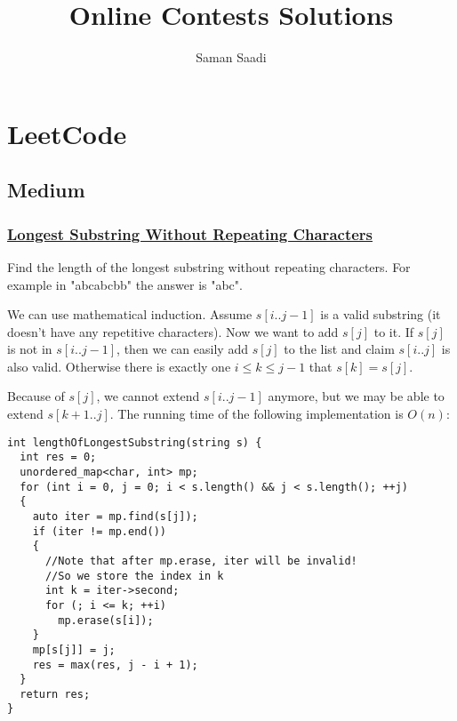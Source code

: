 \documentclass{book}
\title{Online Contests Solutions}
\author{Saman Saadi}
\date{}
\begin{document}
	\frontmatter
	\maketitle
	\tableofcontents
	\mainmatter
	\chapter{LeetCode}
	\section{Medium}
	\subsection{\href{https://leetcode.com/problems/longest-substring-without-repeating-characters}{Longest Substring Without Repeating Characters}}
	Find the length of the longest substring without repeating characters. For example in "abcabcbb" the answer is "abc".
	\par We can use mathematical induction. Assume $s[i..j - 1]$ is a valid substring (it doesn't have any repetitive characters). Now we want to add $s[j]$ to it. If $s[j]$ is not in $s[i..j-1]$, then we can easily add $s[j]$ to the list and claim $s[i..j]$ is also valid. Otherwise there is exactly one $i \le k \le j - 1$ that $s[k] = s[j]$.
	\par Because of $s[j]$, we cannot extend $s[i..j - 1]$ anymore, but we may be able to extend $s[k +1..j]$. The running time of the following implementation is $O(n)$:
	\begin{lstlisting}
int lengthOfLongestSubstring(string s) {
  int res = 0;
  unordered_map<char, int> mp;
  for (int i = 0, j = 0; i < s.length() && j < s.length(); ++j)
  {
    auto iter = mp.find(s[j]);
    if (iter != mp.end())
    {
      //Note that after mp.erase, iter will be invalid!
      //So we store the index in k
      int k = iter->second;
      for (; i <= k; ++i)
        mp.erase(s[i]);
    }
    mp[s[j]] = j;
    res = max(res, j - i + 1);
  }
  return res;
}
	\end{lstlisting}
\end{document}
